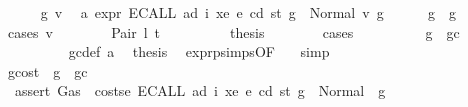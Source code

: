 \begin{isabellebody}
\ \ \ \ \isamarkupfalse%
\ g{}{\isacharprime}{\kern0pt}\ v{}\ \isamarkupfalse%
\ a{}{\isacharcolon}{\kern0pt}\ {\isachardoublequoteopen}expr\ {\isacharparenleft}{\kern0pt}ECALL\ ad\ i\ xe{\isacharparenright}{\kern0pt}\ e\ cd\ st\ g\ {\isacharequal}{\kern0pt}\ Normal\ {\isacharparenleft}{\kern0pt}v{}{\isacharcomma}{\kern0pt}\ g{}{\isacharprime}{\kern0pt}{\isacharparenright}{\kern0pt}{\isachardoublequoteclose}\isanewline
\ \ \ \ \isamarkupfalse%
\ {\isachardoublequoteopen}g{}{\isacharprime}{\kern0pt}\ {\isasymle}\ g{\isachardoublequoteclose}\isanewline
\ \ \ \ \isamarkupfalse%
\ {\isacharparenleft}{\kern0pt}cases\ v{}{\isacharparenright}{\kern0pt}\isanewline
\ \ \ \ \ \ \isamarkupfalse%
\ {\isacharparenleft}{\kern0pt}Pair\ l{}\ t{}{\isacharparenright}{\kern0pt}\isanewline
\ \ \ \ \ \ \isamarkupfalse%
\ \isamarkupfalse%
\ {\isacharquery}{\kern0pt}thesis\isanewline
\ \ \ \ \ \ \isamarkupfalse%
\ {\isacharparenleft}{\kern0pt}cases{\isacharparenright}{\kern0pt}\isanewline
\ \ \ \ \ \ \ \ \isamarkupfalse%
\ {\isachardoublequoteopen}g\ {\isasymle}\ gc{\isachardoublequoteclose}\isanewline
\ \ \ \ \ \ \ \ \isamarkupfalse%
\ gc{\isacharunderscore}{\kern0pt}def\ a{}\ \isamarkupfalse%
\ {\isacharquery}{\kern0pt}thesis\ \isamarkupfalse%
\ expr{\isachardot}{\kern0pt}psimps{\isacharparenleft}{\kern0pt}{}{}{\isacharparenright}{\kern0pt}{\isacharbrackleft}{\kern0pt}OF\ {}{}{\isacharparenleft}{\kern0pt}{}{\isacharparenright}{\kern0pt}{\isacharbrackright}{\kern0pt}\ \isamarkupfalse%
\ simp\isanewline
\ \ \ \ \ \ \isamarkupfalse%
\isanewline
\ \ \ \ \ \ \ \ \isamarkupfalse%
\ gcost{\isacharcolon}{\kern0pt}\ {\isachardoublequoteopen}{\isasymnot}\ g\ {\isasymle}\ gc{\isachardoublequoteclose}\isanewline
\ \ \ \ \ \ \ \ \isamarkupfalse%
\ \isamarkupfalse%
\ {\isacharasterisk}{\kern0pt}{\isacharcolon}{\kern0pt}\ {\isachardoublequoteopen}assert\ Gas\ {\isacharparenleft}{\kern0pt}{\isacharparenleft}{\kern0pt}{\isacharless}{\kern0pt}{\isacharparenright}{\kern0pt}\ {\isacharparenleft}{\kern0pt}costs\isactrlsub e\ {\isacharparenleft}{\kern0pt}ECALL\ ad\ i\ xe{\isacharparenright}{\kern0pt}\ e\ cd\ st{\isacharparenright}{\kern0pt}{\isacharparenright}{\kern0pt}\ g\ {\isacharequal}{\kern0pt}\ Normal\ {\isacharparenleft}{\kern0pt}{\isacharparenleft}{\kern0pt}{\isacharparenright}{\kern0pt}{\isacharcomma}{\kern0pt}\ g{\isacharparenright}{\kern0pt}{\isachardoublequoteclose}\ \isamarkupfalse%

\end{isabellebody}
